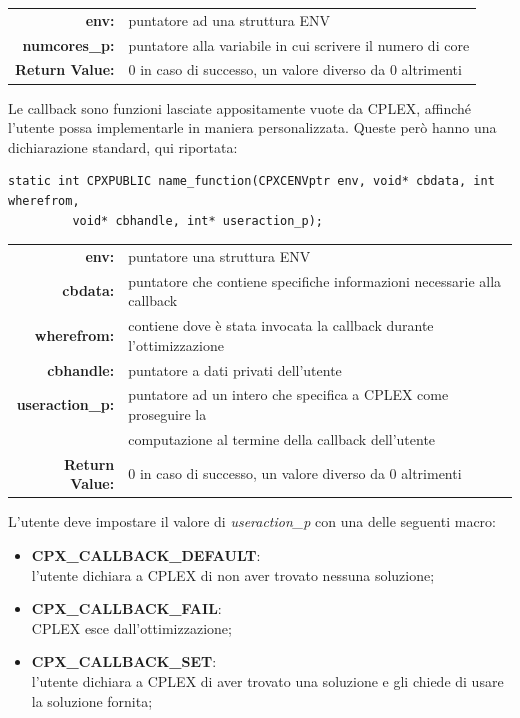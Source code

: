 \begin{table}[h]
\centering
\begin{tabular}{rl}
\textbf{env:} & {puntatore ad una struttura ENV}\\
\textbf{numcores\_p:} & {puntatore alla variabile in cui scrivere il numero di core}\\ 
\textbf{Return Value:} & {0 in caso di successo, un valore diverso da 0 altrimenti}\\           
\end{tabular}
\end{table} 
Le callback sono funzioni lasciate appositamente vuote da CPLEX, affinché l'utente possa implementarle in maniera personalizzata. Queste però hanno una dichiarazione standard, qui riportata:
\begin{center}
\begin{lstlisting}[linewidth=400pt, basicstyle=\footnotesize\sffamily,]     
static int CPXPUBLIC name_function(CPXCENVptr env, void* cbdata, int wherefrom,
		 void* cbhandle, int* useraction_p);
\end{lstlisting}
\end{center}
\begin{table}[h]
\centering
\begin{tabular}{rl}
\textbf{env:} & {puntatore una struttura ENV}\\
\textbf{cbdata:} & {puntatore che contiene specifiche informazioni necessarie alla callback}\\
\textbf{wherefrom:} & {contiene dove è stata invocata la callback durante l'ottimizzazione} \\ 
\textbf{cbhandle:} & {puntatore a dati privati dell'utente} \\
\textbf{useraction\_p:} & {puntatore ad un intero che specifica a CPLEX come proseguire la }\\
&{computazione al termine della callback dell'utente}\\ 
\textbf{Return Value:} & {0 in caso di successo, un valore diverso da 0 altrimenti}\\                      
\end{tabular}
\end{table} 

L'utente deve impostare il valore di \textit{useraction\_p} con una delle seguenti macro:
\begin{itemize}
\item{\textbf{CPX\_CALLBACK\_DEFAULT}:\\
l'utente dichiara a CPLEX di non aver trovato nessuna soluzione;}
\item{\textbf{CPX\_CALLBACK\_FAIL}:\\
CPLEX esce dall'ottimizzazione;}
\item{\textbf{CPX\_CALLBACK\_SET}:\\
l'utente dichiara a CPLEX di aver trovato una soluzione e gli chiede di usare la soluzione fornita;}
\end{itemize}

